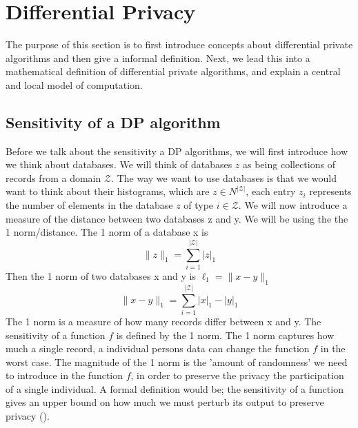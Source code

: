 \documentclass[11pt]{article}
\theoremstyle{definition}
\begin{document}
\section{Differential Privacy}
The purpose of this section is to first introduce concepts about differential private algorithms and then give a informal definition. Next, we lead this into a mathematical definition of differential private algorithms, and explain a central and local model of computation. 
\subsection{Sensitivity of a DP algorithm}
Before we talk about the sensitivity a DP algorithms, we will first introduce how we think about databases.
We will think of databases $z$ as being collections of records from a domain $\mathcal{Z}$. The way we want to use databases is that we would want to think about their histograms, which are $z\in N^{|\mathcal{Z}|} $, each entry $z_i$ represents the number of elements in the database $z$ of type $i\in \mathcal{Z}$. We will now introduce a measure of the distance between two databases z and y. We will be using the the 1 norm/distance. The 1 norm of a database x is 
\[\lVert z \rVert_1 = \sum_{i=1}^{|\mathcal{Z}|} | z |_1\]
Then the 1 norm of two databases x and y is $\ell_1 = \lVert x-y \rVert_1$
\[\lVert x-y \rVert_1 = \sum_{i=1}^{|\mathcal{Z}|} | x |_1-| y |_1\]
The 1 norm is a measure of how many records differ between x and y. The sensitivity of a function $f$ is defined by the 1 norm. The 1 norm captures how much a single record, a individual persons data can change the function $f$ in the worst case. The magnitude of the 1 norm is the 'amount of randomness' we need to introduce in the function $f$, in order to preserve the privacy the participation of a single individual. A formal definition would be; the sensitivity of a function gives an upper bound on how much we must perturb its output to preserve privacy (\cite[17]{algo_fun}).
\end{document}
